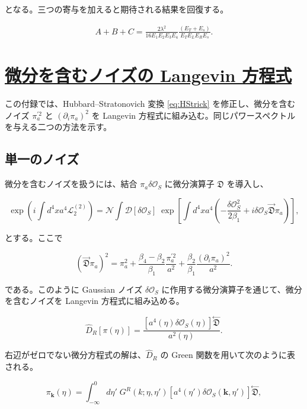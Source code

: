\documentclass[a4paper,11pt]{ltjsarticle}
\newcommand{\sectionlink}[1]{\section[#1]{\hyperlink{toc}{#1}}}
\numberwithin{equation}{section}
\def\pia{\pi_{a}}
\def\bfk{\textbf{k}}
\newcommand{\Os}{\delta \mathcal{O}_{S}}
\begin{document}
となる。三つの寄与を加えると期待される結果を回復する。

\begin{align}
A+B+C = \frac{2 \lambda^2}{16 E_1 E_2 E_3 E_4} \frac{(E_T+E_s)}{E_T E_L E_R E_s}.
\end{align}

\sectionlink{微分を含むノイズの Langevin 方程式}\label{app:Langevin}

この付録では、Hubbard--Stratonovich 変換 \eqref{eq:HStrick} を修正し、微分を含むノイズ $\pia^{\prime2}$ と $(\partial_i\pia)^2$ を Langevin 方程式に組み込む。同じパワースペクトルを与える二つの方法を示す。

\subsection*{単一のノイズ}

微分を含むノイズを扱うには、結合 $\pia\Os$ に微分演算子 $\mathfrak{D}$ を導入し、

\begin{equation}
\exp\left(i\int d^{4}x a^{4}\mathcal{L}_{2}^{(2)}\right)=\mathcal{N}\int\mathcal{D}[\Os]\;\exp\left[\int d^{4}x a^{4}\left(-\frac{\Os^{2}}{2\beta_{1}}+i\Os\overset{\rightarrow}{\mathfrak{D}}\pia\right)\right],
\end{equation}

とする。ここで

\begin{equation}\label{eq:frakDprop}
(\overset{\rightarrow}{\mathfrak{D}}\pia)^{2}=\pia^{2}+\frac{\beta_{4}-\beta_{2}}{\beta_{1}}\frac{\pia^{\prime2}}{a^{2}}+\frac{\beta_{2}}{\beta_{1}}\frac{(\partial_{i}\pia)^{2}}{a^{2}}.
\end{equation}

である。このように Gaussian ノイズ $\Os$ に作用する微分演算子を通じて、微分を含むノイズを Langevin 方程式に組み込める。

\begin{equation}
\widehat{D}_{R} [\pi(\eta)] =\frac{\left[a^{4}(\eta)\Os(\eta)\right]\overset{\leftarrow}{\mathfrak{D}}}{a^{2}(\eta)}.
\end{equation}

右辺がゼロでない微分方程式の解は、$\widehat{D}_R$ の Green 関数を用いて次のように表される。

\begin{equation}
\pi_{\bfk}(\eta)=\int_{-\infty}^{0}d\eta'\; G^{R}(k;\eta,\eta')\left[a^{4}(\eta')\delta\mathcal{O}_{S}(\bfk, \eta')\right]\overset{\leftarrow}{\mathfrak{D}},
\end{equation}
\end{document}
